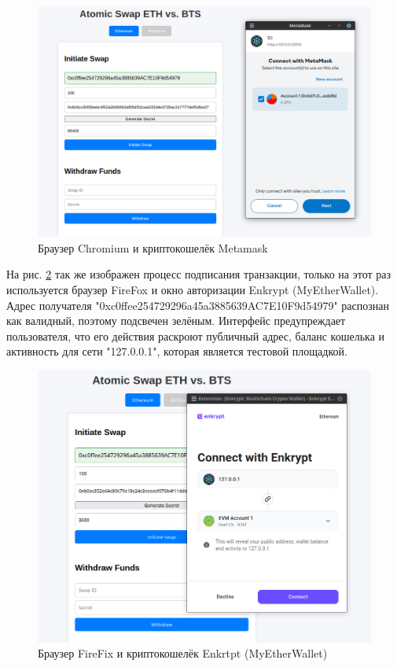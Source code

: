 \begin{figure}[H]
\centering
\includegraphics[scale=0.4]{res/ChromMetamask}
\caption{Браузер Chromium и криптокошелёк Metamask}
\label{pic:ChromMetamask}
\end{figure}

На рис. \ref{pic:FFEnkrtpt} так же изображен процесс подписания транзакции, только на этот раз используется браузер FireFox и окно авторизации Enkrypt (MyEtherWallet). Адрес получателя "0xc0ffee254729296a45a3885639AC7E10F9d54979" распознан как валидный, поэтому подсвечен зелёным. Интерфейс предупреждает пользователя, что его действия раскроют публичный адрес, баланс кошелька и активность для сети "127.0.0.1", которая является тестовой площадкой.

\begin{figure}[H]
\centering
\includegraphics[scale=0.4]{res/FFEnkrtpt}
\caption{Браузер FireFix и криптокошелёк Enkrtpt (MyEtherWallet)}
\label{pic:FFEnkrtpt}
\end{figure}

